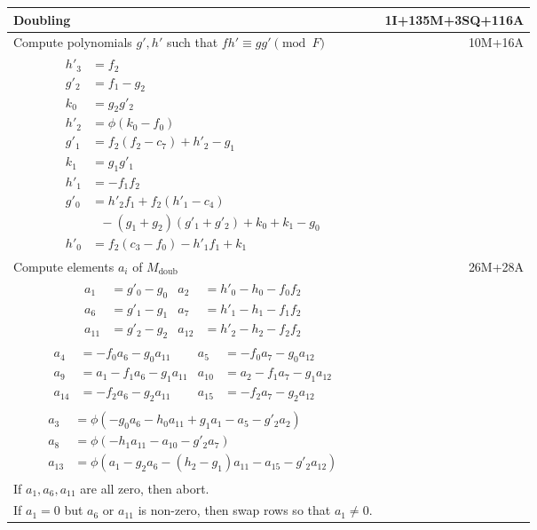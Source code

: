 \pagebreak
\begin{tabularx}{\linewidth}{|Xr|}
  \hline
  Doubling & 1I+135M+3SQ+116A \\
  \hline
  Compute polynomials $g',h'$ such that $fh' \equiv gg' \pmod F$ & 10M+16A \\
  \hline
  {\begin{align*}
    h'_3 &= f_2 \\
    g'_2 &= f_1 - g_2 \\
    k_0  &= g_2g'_2 \\
    h'_2 &= \phi(k_0 - f_0) \\ 
    g'_1 &= f_2(f_2 - c_7) + h'_2 - g_1 \\
    k_1  &= g_1g'_1 \\
    h'_1 &= -f_1f_2 \\
    g'_0 &= h'_2f_1 + f_2(h'_1 - c_4) \\
         & ~~~ - (g_1 + g_2)(g'_1 + g'_2) + k_0 + k_1 - g_0 \\
    h'_0 &= f_2(c_3 - f_0) - h'_1f_1 + k_1
  \end{align*}} & \\
  \hline
  Compute elements $a_i$ of $M_{\text{doub}}$ & 26M+28A \\
  \hline
  {\begin{align*}
    a_1    &= g'_0 - g_0 & a_2    &= h'_0 - h_0 - f_0f_2 \\
    a_6    &= g'_1 - g_1 & a_7    &= h'_1 - h_1 - f_1f_2 \\
    a_{11} &= g'_2 - g_2 & a_{12} &= h'_2 - h_2 - f_2f_2
  \end{align*}} & \\
  {\begin{align*}
    a_4    &=     - f_0a_6 - g_0a_{11} & a_5    &=     - f_0a_7 - g_0a_{12} \\
    a_9    &= a_1 - f_1a_6 - g_1a_{11} & a_{10} &= a_2 - f_1a_7 - g_1a_{12} \\
    a_{14} &=     - f_2a_6 - g_2a_{11} & a_{15} &=     - f_2a_7 - g_2a_{12}
  \end{align*}} & \\
  {\begin{align*}
    a_3    &= \phi \left(     - g_0a_6 - h_0a_{11} + g_1a_1    - a_5    - g'_2a_2    \right) \\
    a_8    &= \phi \left(              - h_1a_{11}             - a_{10} - g'_2a_7    \right) \\
    a_{13} &= \phi \left( a_1 - g_2a_6 - (h_2 - g_1)a_{11}     - a_{15} - g'_2a_{12} \right)
  \end{align*}} & \\
  If $a_1, a_6, a_{11}$ are all zero, then abort. & \\
  If $a_1 = 0$ but $a_6$ or $a_{11}$ is non-zero, then swap rows so that $a_1 \neq 0$. & \\
  \hline
\end{tabularx}

